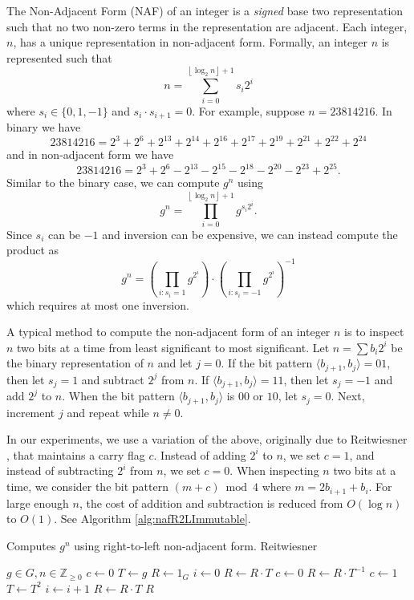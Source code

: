 \documentclass{ucalgthes1}
\theoremstyle{definition}
\newcommand{\ZZgez}{\mathbb{Z}_{\ge 0}}
\newcommand{\floor}[1]{\left\lfloor #1 \right\rfloor}
\begin{document}
The Non-Adjacent Form (NAF) of an integer is a \emph{signed} base two representation such that no two non-zero terms in the representation are adjacent. Each integer, $n$, has a unique representation in non-adjacent form. Formally, an integer $n$ is represented such that
\[
	n = \sum_{i=0}^{\floor{\log_2 n}+1} s_i 2^i
\]
where $s_i \in \{0, 1, -1\}$ and $s_i \cdot s_{i+1} = 0$. For example, suppose $n = 23814216$.  In binary we have
\begin{equation}\label{eq:binaryEg}
	23814216 = 2^3+2^6+2^{13}+2^{14}+2^{16}+2^{17}+2^{19}+2^{21}+2^{22}+2^{24}
\end{equation}
and in non-adjacent form we have
\begin{equation}\label{eq:nafEg}
	23814216 = 2^3+2^6-2^{13}-2^{15}-2^{18}-2^{20}-2^{23}+2^{25}.
\end{equation}
Similar to the binary case, we can compute $g^n$ using
\[
	g^n = \prod _{i=0}^{\floor{\log_2 n}+1} g^{s_i 2^i}.
\]
Since $s_i$ can be $-1$ and inversion can be expensive, we can instead compute the product as
\[
	g^n = \left( \prod_{i : s_i=1} g^{2^i} \right) \cdot \left( \prod_{i : s_i=-1} g^{2^i} \right)^{-1}
\]
which requires at most one inversion.

A typical method to compute the non-adjacent form of an integer $n$ is to inspect $n$ two bits at a time from least significant to most significant.  Let $n=\sum b_i2^i$ be the binary representation of $n$ and let $j=0$.  If the bit pattern $\langle b_{j+1}, b_j \rangle = 01$, then let $s_j = 1$ and subtract $2^j$ from $n$.  If $\langle b_{j+1}, b_j \rangle = 11$, then let $s_j = -1$ and add $2^j$ to $n$.  When the bit pattern $\langle b_{j+1}, b_j \rangle$ is $00$ or $10$, let $s_j = 0$. Next, increment $j$ and repeat while $n \ne 0$.

In our experiments, we use a variation of the above, originally due to Reitwiesner \cite{reitwiesner1960}, that maintains a carry flag $c$.  Instead of adding $2^i$ to $n$, we set $c = 1$, and instead of subtracting $2^i$ from $n$, we set $c = 0$.  When inspecting $n$ two bits at a time, we consider the bit pattern $(m+c) \bmod 4$ where $m = 2 b_{i+1} + b_i$.  For large enough $n$, the cost of addition and subtraction is reduced from $O(\log n)$ to $O(1)$.  See Algorithm \ref{alg:nafR2LImmutable}.

\begin{algorithm}[h]
\caption{Computes $g^n$ using right-to-left non-adjacent form. Reitwiesner \cite{reitwiesner1960}}
\label{alg:nafR2LImmutable}
\begin{algorithmic}[1]
\REQUIRE $g \in G, n \in \ZZgez$
\STATE $c \gets 0$ 
\STATE $T \gets g$ 
\STATE $R \gets 1_G$
\STATE $i \gets 0$
	\IF {$\floor{n/2^i}+c \equiv 1 \pmod 4$}
		\STATE $R \gets R \cdot T$
		\STATE $c \gets 0$
	\ELSIF {$\floor{n/2^i}+c \equiv 3 \pmod 4$}
		\STATE $R \gets R \cdot T^{-1}$
		\STATE $c \gets 1$
	\ENDIF
	\STATE $T \gets T^2$
	\STATE $i \gets i+1$
\ENDWHILE
{} \STATE $R \gets R \cdot T$ \ENDIF
\RETURN $R$
\end{algorithmic}
\end{algorithm}
\end{document}
